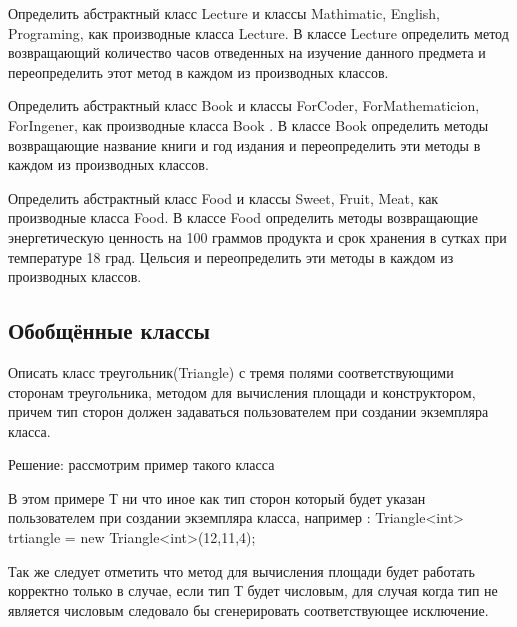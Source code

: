 \task Определить абстрактный класс Lecture и классы Mathimatic,
English, Programing, как производные класса Lecture. В классе Lecture
определить метод возвращающий количество часов отведенных на изучение
данного предмета и переопределить этот метод в каждом из производных
классов.

\task Определить абстрактный класс Book и классы ForCoder,
ForMathematicion, ForIngener, как производные класса Book . В классе
Book определить методы возвращающие название книги и год издания и
переопределить эти методы в каждом из производных классов.

\task Определить абстрактный класс Food и классы Sweet, Fruit, Meat,
как производные класса Food. В классе Food определить методы
возвращающие энергетическую ценность на 100 граммов продукта и срок
хранения в сутках при температуре 18 град. Цельсия и переопределить
эти методы в каждом из производных классов.

\subsection{Обобщённые классы}

Описать класс треугольник(Triangle) с тремя полями соответствующими
сторонам треугольника, методом для вычисления площади и конструктором,
причем тип сторон должен задаваться пользователем при создании
экземпляра класса.

Решение: рассмотрим пример такого класса


    
    
        

В этом примере Т ни что иное как тип сторон который будет указан
пользователем при создании экземпляра класса, например : Triangle<int>
trtiangle = new Triangle<int>(12,11,4);

Так же следует отметить что метод для вычисления площади будет
работать корректно только в случае, если тип Т будет числовым, для
случая когда тип не является числовым следовало бы сгенерировать
соответствующее исключение.

